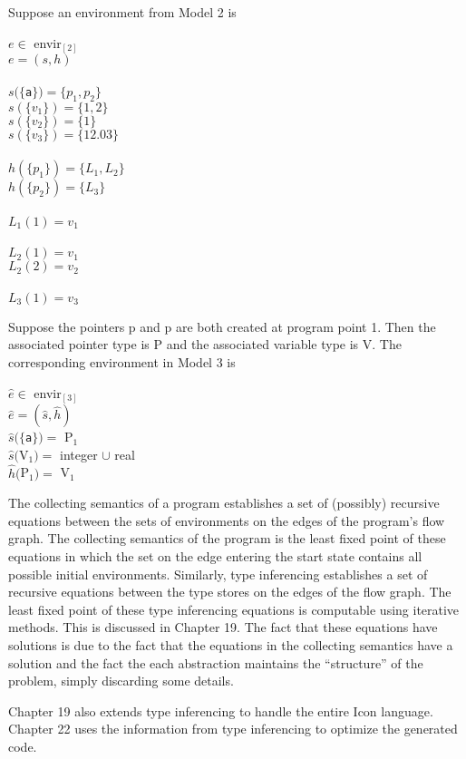 Suppose an environment from Model 2 is 

\goodbreak
\begin{specialcode}{}
\> $e \in $ envir$_{[2]}$\\
\> $e = (s, h)$\\
\\
\> $s(\{$\texttt{a}$\}) = \{ p_1 , p_2\}$\\
\> $s(\{v_1\}) = \{1, 2\}$\\
\> $s(\{v_2\}) = \{1\}$\\
\> $s(\{v_3\}) = \{12.03\}$\\
\\
\> $h(\{p_1\}) = \{L_1, L_2\}$\\
\> $h(\{p_2\}) = \{L_3\}$\\
\\
\> $L_1(1) = v_1$\\
\\
\> $L_2(1) = v_1$\\
\> $L_2(2) = v_2$\\
\\
\> $L_3(1) = v_3$\\
\end{specialcode}

Suppose the pointers p and p are
both created at program point 1. Then the associated pointer type is
P and the associated variable type is
V. The corresponding environment in Model 3 is

\goodbreak
\begin{specialcode}{}
\>$\hat{e} \in $ envir$_{[3]}$\\
\>$\hat{e} = (\hat{s},\hat{h})$\\

\>$\hat{s}(\{$\texttt{a}$\}) =  $ P$_1$\\
\>$\hat{s}($V$_1) = $ integer  $\cup$ real\\

\>$\hat{h}($P$_1) = $ V$_1$\\
\end{specialcode}



The collecting semantics of a program establishes a set of (possibly)
recursive equations between the sets of environments on the edges of
the program's flow graph. The collecting semantics of the program is
the least fixed point of these equations in which the set on the edge
entering the start state contains all possible initial environments.
Similarly, type inferencing establishes a set of recursive equations
between the type stores on the edges of the flow graph. The least
fixed point of these type inferencing equations is computable using
iterative methods. This is discussed in Chapter 19. The fact that
these equations have solutions is due to the fact that the equations
in the collecting semantics have a solution and the fact the each
abstraction maintains the ``structure'' of the problem, simply
discarding some details.

Chapter 19 also extends type inferencing to handle the entire Icon
language. Chapter 22 uses the information from type inferencing to
optimize the generated code.

